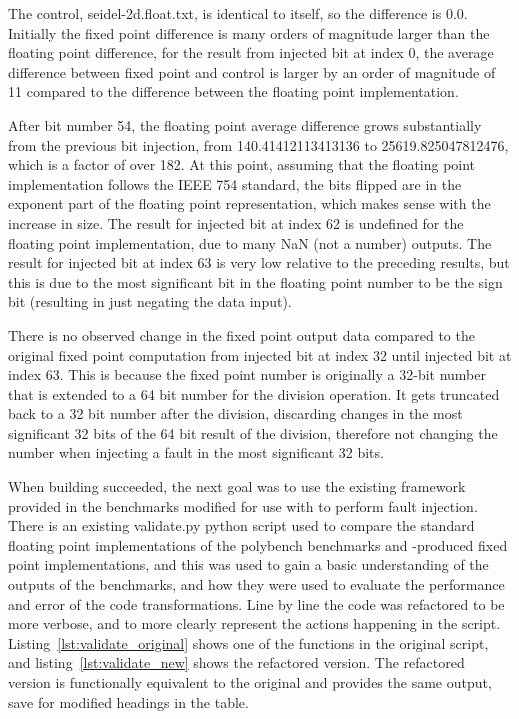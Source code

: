 The control, seidel-2d.float.txt, is identical to itself, so the difference is 0.0. Initially the fixed point difference is many orders of magnitude larger than the floating point difference, for the result from injected bit at index 0, the average difference between fixed point and control is larger by an order of magnitude of 11 compared to the difference between the floating point implementation. 

After bit number 54, the floating point average difference grows substantially from the previous bit injection, from 140.41412113413136 to 25619.825047812476, which is a factor of over 182. At this point, assuming that the floating point implementation follows the IEEE 754 standard, the bits flipped are in the exponent part of the floating point representation, which makes sense with the increase in size. The result for injected bit at index 62 is undefined for the floating point implementation, due to many NaN (not a number) outputs. The result for injected bit at index 63 is very low relative to the preceding results, but this is due to the most significant bit in the floating point number to be the sign bit (resulting in just negating the data input).

There is no observed change in the fixed point output data compared to the original fixed point computation from injected bit at index 32 until injected bit at index 63. This is because the fixed point number is originally a 32-bit number that is extended to a 64 bit number for the division operation. It gets truncated back to a 32 bit number after the division, discarding changes in the most significant 32 bits of the 64 bit result of the division, therefore not changing the number when injecting a fault in the most significant 32 bits. 


When building \taffo{}  succeeded, the next goal was to use the existing framework provided in the benchmarks modified for use with \taffo{} to perform fault injection. There is an existing validate.py python script used to compare the standard floating point implementations of the polybench benchmarks and \taffo{}-produced fixed point implementations, and this was used to gain a basic understanding of the outputs of the benchmarks, and how they were used to evaluate the performance and error of the \taffo{} code transformations. Line by line the code was refactored to be more verbose, and to more clearly represent the actions happening in the script.
Listing~\ref{lst:validate_original} shows one of the functions in the original script, and listing~\ref{lst:validate_new} shows the refactored version. The refactored version is functionally equivalent to the original and provides the same output, save for modified headings in the table.




